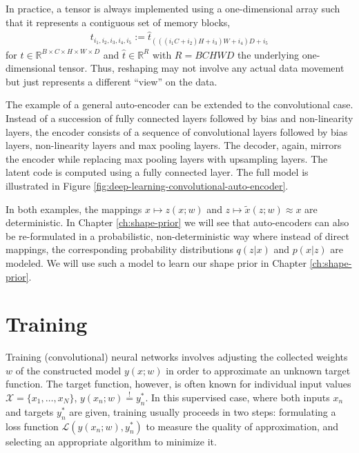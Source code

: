 In practice, a tensor is always implemented using a one-dimensional array such that
it represents a contiguous set of memory blocks, \eg
\begin{align}
  t_{i_1, i_2, i_3, i_4, i_5} := \hat{t}_{(((i_1C + i_2)H + i_3)W + i_4)D + i_5}
\end{align}
for $t \in \mathbb{R}^{B \times C \times H \times W \times D}$ and $\hat{t} \in \mathbb{R}^R$
with $R = BCHWD$ the underlying one-dimensional tensor.
Thus, reshaping may not involve any actual data movement
but just represents a different ``view'' on the data.

\begin{example}
  \label{ex:deep-learning-convolutional-auto-encoder}
  The example of a general auto-encoder can be extended to the convolutional
  case. Instead of a succession of fully connected layers
  followed by bias and non-linearity layers, the encoder consists of a sequence of 
  convolutional layers followed by bias layers, non-linearity layers and max
  pooling layers. The decoder, again, mirrors the encoder while replacing
  max pooling layers with upsampling layers. The latent code is computed using a fully
  connected layer. The full model is illustrated in Figure \ref{fig:deep-learning-convolutional-auto-encoder}.
\end{example}

In both examples, the mappings $x \mapsto z(x;w)$ and
$z \mapsto \tilde{x}(z;w) \approx x$ are deterministic.
In Chapter \ref{ch:shape-prior} we will see that auto-encoders can also be
re-formulated in a probabilistic, non-deterministic way \cite{KingmaWelling:2013}
where instead of direct mappings, the corresponding probability distributions $q(z | x)$
and $p(x|z)$ are modeled. We will use such a model to learn our shape prior
in Chapter \ref{ch:shape-prior}.

\section{Training}

Training (convolutional) neural networks involves adjusting the collected weights
$w$ of the constructed model $y(x;w)$ in order to approximate an
unknown target function. The target function, however,
is often known for individual input values
$\mathcal{X} = \{x_1,\ldots,x_N\}$, \ie $y(x_n;w) \overset{!}{=} y^*_n$.
In this supervised case, \ie where both inputs $x_n$ and targets $y_n^*$
are given, training usually proceeds in two steps: formulating a loss function
$\mathcal{L}(y(x_n;w),y^*_n)$ to measure the quality of approximation,
and selecting an appropriate algorithm to minimize it.


